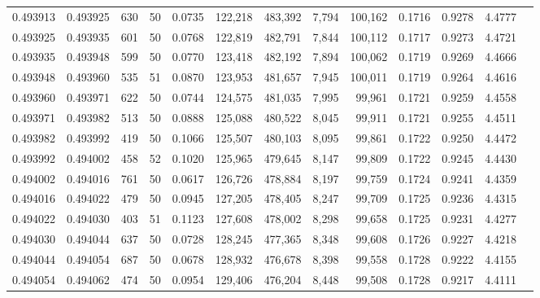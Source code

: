 \begin{tabular}{rrrrrrrrrrrrr}
0.493913 & 0.493925 &   630 &  50 &                                     0.0735 & 122,218 & 483,392 &   7,794 & 100,162 & 0.1716 & 0.9278 & 4.4777 \\
0.493925 & 0.493935 &   601 &  50 &                                     0.0768 & 122,819 & 482,791 &   7,844 & 100,112 & 0.1717 & 0.9273 & 4.4721 \\
0.493935 & 0.493948 &   599 &  50 &                                     0.0770 & 123,418 & 482,192 &   7,894 & 100,062 & 0.1719 & 0.9269 & 4.4666 \\
0.493948 & 0.493960 &   535 &  51 &                                     0.0870 & 123,953 & 481,657 &   7,945 & 100,011 & 0.1719 & 0.9264 & 4.4616 \\
0.493960 & 0.493971 &   622 &  50 &                                     0.0744 & 124,575 & 481,035 &   7,995 &  99,961 & 0.1721 & 0.9259 & 4.4558 \\
0.493971 & 0.493982 &   513 &  50 &                                     0.0888 & 125,088 & 480,522 &   8,045 &  99,911 & 0.1721 & 0.9255 & 4.4511 \\
0.493982 & 0.493992 &   419 &  50 &                                     0.1066 & 125,507 & 480,103 &   8,095 &  99,861 & 0.1722 & 0.9250 & 4.4472 \\
0.493992 & 0.494002 &   458 &  52 &                                     0.1020 & 125,965 & 479,645 &   8,147 &  99,809 & 0.1722 & 0.9245 & 4.4430 \\
0.494002 & 0.494016 &   761 &  50 &                                     0.0617 & 126,726 & 478,884 &   8,197 &  99,759 & 0.1724 & 0.9241 & 4.4359 \\
0.494016 & 0.494022 &   479 &  50 &                                     0.0945 & 127,205 & 478,405 &   8,247 &  99,709 & 0.1725 & 0.9236 & 4.4315 \\
0.494022 & 0.494030 &   403 &  51 &                                     0.1123 & 127,608 & 478,002 &   8,298 &  99,658 & 0.1725 & 0.9231 & 4.4277 \\
0.494030 & 0.494044 &   637 &  50 &                                     0.0728 & 128,245 & 477,365 &   8,348 &  99,608 & 0.1726 & 0.9227 & 4.4218 \\
0.494044 & 0.494054 &   687 &  50 &                                     0.0678 & 128,932 & 476,678 &   8,398 &  99,558 & 0.1728 & 0.9222 & 4.4155 \\
0.494054 & 0.494062 &   474 &  50 &                                     0.0954 & 129,406 & 476,204 &   8,448 &  99,508 & 0.1728 & 0.9217 & 4.4111 \\

\end{tabular}
